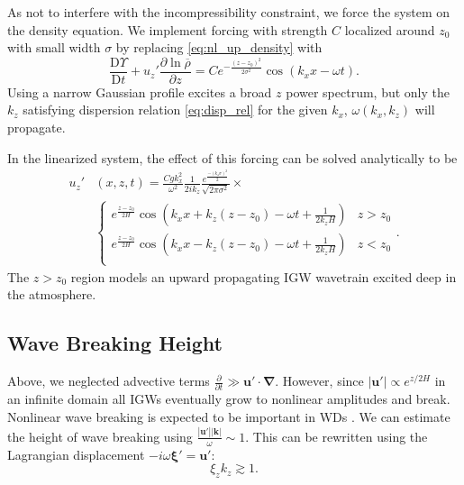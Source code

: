 \documentclass[
        fleqn,
        usenatbib,
    ]{mnras}
\newcommand*{\pd}[2]{\frac{\partial#1}{\partial#2}}
\newcommand*{\md}[2]{\frac{\mathrm{D}#1}{\mathrm{D}#2}}
\newcommand*{\abs}[1]{\left|#1\right|}
\newcommand*{\p}[1]{\left(#1\right)}
\newcommand*{\bm}[1]{\boldsymbol{\mathbf{#1}}}
\begin{document}
As not to interfere with the incompressibility constraint, we force the system
on the density equation. We implement forcing with strength $C$ localized around
$z_0$ with small width $\sigma$ by replacing \autoref{eq:nl_up_density} with
\begin{equation}
    \md{\Upsilon}{t} + u_{z}'\pd{\ln \overline{\rho}}{z}
        = Ce^{-\frac{(z - z_0)^2}{2\sigma^2}}
            \cos \p{k_{x}x - \omega t}.\label{eq:vol_drive}
\end{equation}
Using a narrow Gaussian profile excites a broad $z$ power spectrum, but only the
$k_{z}$ satisfying dispersion relation \autoref{eq:disp_rel} for the given
$k_{x}$, $\omega(k_{x}, k_{z})$ will propagate.

In the linearized system, the effect of this forcing can be solved analytically
to be
\begin{align}
    u_{z}'&(x, z, t) ={} \frac{Cgk_{x}^2}{\omega^2}
        \frac{1}{2ik_{z}}\frac{e^{\frac{-(k_{z}\sigma)^2}{2}}}
        {\sqrt{2\pi\sigma^2}} \times\nonumber\\
        &{}\begin{cases}
        e^{\frac{z - z_0}{2H}}\cos\p{k_{x}x + k_{z}(z - z_0) - \omega t
            + \frac{1}{2k_{z}H}}
            & z > z_0\\
        e^{\frac{z - z_0}{2H}}\cos\p{k_{x}x - k_{z}(z - z_0) - \omega t
            + \frac{1}{2k_{z}H}}
            & z < z_0\\
    \end{cases}.\label{eq:uz_lin}
\end{align}
The $z > z_0$ region models an upward propagating IGW wavetrain excited deep
in the atmosphere.

\subsection{Wave Breaking Height}\label{ss:wave_breaking}

Above, we neglected advective terms $\pd{}{t} \gg \bm{u}' \cdot \bm{\nabla}$.
However, since $\abs{\bm{u}'} \propto e^{z/2H}$ in an infinite domain all IGWs
eventually grow to nonlinear amplitudes and break. Nonlinear wave breaking is
expected to be important in WDs \citep{fullerI,fullerII}. We can
estimate the height of wave breaking using $\frac{\abs{\bm{u}'}
\abs{\bm{k}}}{\omega} \sim 1$. This can be rewritten using the Lagrangian
displacement $-i\omega \bm{\xi}' = \bm{u}'$:
\begin{equation}
    \xi_z k_z \gtrsim 1.\label{eq:nl}
\end{equation}
\end{document}
